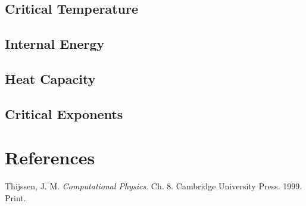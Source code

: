 \documentclass[letterpaper,12pt]{article}
\numberwithin{equation}{subsection}
\begin{document}
\subsection{Critical Temperature}
\subsection{Internal Energy}
\subsection{Heat Capacity}
\subsection{Critical Exponents}
\newpage
\thispagestyle{empty}
\mbox{}

\newpage
\section{References}
\begin{thebibliography}{99}
 Thijssen, J. M. \textit{Computational Physics}. Ch. 8. Cambridge University Press. 1999. Print.
\end{thebibliography}
\end{document}
